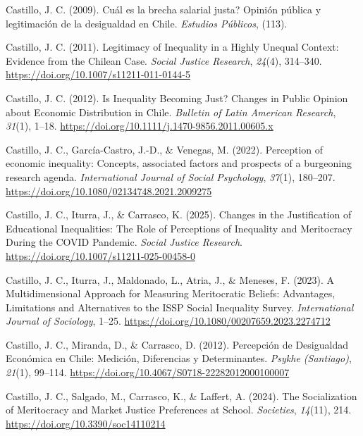 \documentclass[
  12pt,
]{article}
\newlength{\cslhangindent}
\newenvironment{CSLReferences}[2] %
 {\begin{list}{}{%
  \setlength{\itemindent}{0pt}
  \setlength{\leftmargin}{0pt}
  \setlength{\parsep}{0pt}
  \ifodd #1
   \setlength{\leftmargin}{\cslhangindent}
   \setlength{\itemindent}{-1\cslhangindent}
  \fi
  \setlength{\itemsep}{#2\baselineskip}}}
 {\end{list}}
\begin{document}
\begin{CSLReferences}{1}{0}
Castillo, J. C. (2009). {{\textquestiondown}Cu{á}l es la brecha salarial
justa? Opini{ó}n p{ú}blica y legitimaci{ó}n de la desigualdad en Chile}.
\emph{Estudios P{ú}blicos}, (113).

Castillo, J. C. (2011). Legitimacy of {Inequality} in a {Highly Unequal
Context}: {Evidence} from the {Chilean Case}. \emph{Social Justice
Research}, \emph{24}(4), 314--340.
\url{https://doi.org/10.1007/s11211-011-0144-5}

Castillo, J. C. (2012). Is {Inequality Becoming Just}? {Changes} in
{Public Opinion} about {Economic Distribution} in {Chile}.
\emph{Bulletin of Latin American Research}, \emph{31}(1), 1--18.
\url{https://doi.org/10.1111/j.1470-9856.2011.00605.x}

Castillo, J. C., García-Castro, J.-D., \& Venegas, M. (2022). Perception
of economic inequality: Concepts, associated factors and prospects of a
burgeoning research agenda. \emph{International Journal of Social
Psychology}, \emph{37}(1), 180--207.
\url{https://doi.org/10.1080/02134748.2021.2009275}

Castillo, J. C., Iturra, J., \& Carrasco, K. (2025). Changes in the
{Justification} of {Educational Inequalities}: {The Role} of
{Perceptions} of {Inequality} and {Meritocracy During} the {COVID
Pandemic}. \emph{Social Justice Research}.
\url{https://doi.org/10.1007/s11211-025-00458-0}

Castillo, J. C., Iturra, J., Maldonado, L., Atria, J., \& Meneses, F.
(2023). A {Multidimensional Approach} for {Measuring Meritocratic
Beliefs}: {Advantages}, {Limitations} and {Alternatives} to the {ISSP
Social Inequality Survey}. \emph{International Journal of Sociology},
1--25. \url{https://doi.org/10.1080/00207659.2023.2274712}

Castillo, J. C., Miranda, D., \& Carrasco, D. (2012). Percepci{ó}n de
{Desigualdad Econ{ó}mica} en {Chile}: {Medici{ó}n}, {Diferencias} y
{Determinantes}. \emph{Psykhe (Santiago)}, \emph{21}(1), 99--114.
\url{https://doi.org/10.4067/S0718-22282012000100007}

Castillo, J. C., Salgado, M., Carrasco, K., \& Laffert, A. (2024). The
{Socialization} of {Meritocracy} and {Market Justice Preferences} at
{School}. \emph{Societies}, \emph{14}(11), 214.
\url{https://doi.org/10.3390/soc14110214}


\end{CSLReferences}
\end{document}
